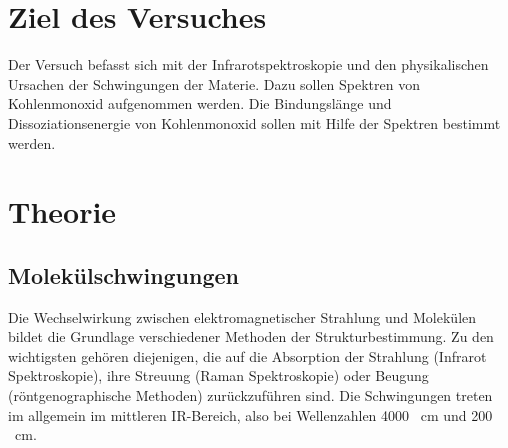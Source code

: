 \documentclass[12pt]{article}
\begin{document}
\section{Ziel des Versuches}
Der Versuch befasst sich mit der Infrarotspektroskopie und den physikalischen Ursachen der Schwingungen der Materie.
Dazu sollen Spektren von Kohlenmonoxid aufgenommen werden.
Die Bindungslänge und Dissoziationsenergie von Kohlenmonoxid sollen mit Hilfe der Spektren bestimmt werden. 
\section {Theorie\supercite{fadini}}
\subsection{Molekülschwingungen}
Die Wechselwirkung zwischen elektromagnetischer Strahlung und Molekülen
bildet die Grundlage verschiedener Methoden der Strukturbestimmung. Zu den wichtigsten
gehören diejenigen, die auf die Absorption der Strahlung (Infrarot Spektroskopie),
ihre Streuung (Raman Spektroskopie) oder Beugung (röntgenographische Methoden)
zurückzuführen sind.
Die Schwingungen treten im allgemein im mittleren IR-Bereich,
also bei Wellenzahlen 4000 \si{\per\centi\meter} und 200 \si{\per\centi\meter}.
\end{document}
